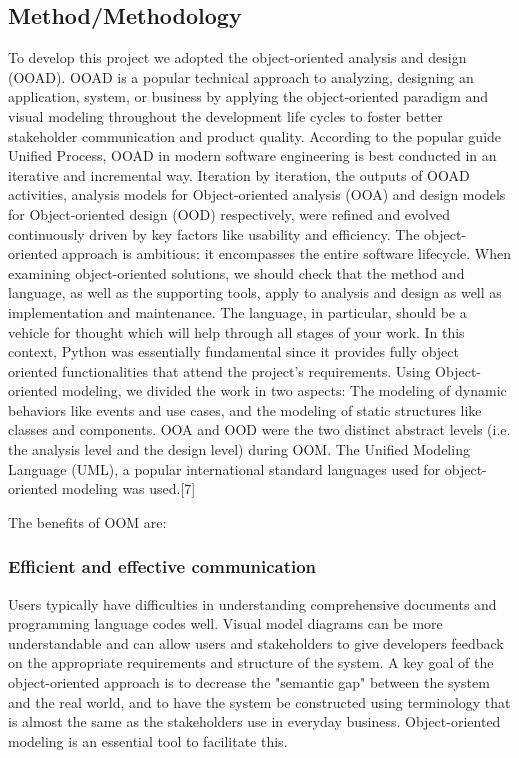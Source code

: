 \documentclass{acm_proc_article-sp}
\begin{document}
\subsection{Method/Methodology}
To develop this project we adopted the object-oriented analysis and design (OOAD). OOAD is a popular technical approach to analyzing, designing an application, system, or business by applying the object-oriented paradigm and visual modeling throughout the development life cycles to foster better stakeholder communication and product quality.
\newline
\newline
According to the popular guide Unified Process, OOAD in modern software engineering is best conducted in an iterative and incremental way. Iteration by iteration, the outputs of OOAD activities, analysis models for Object-oriented analysis (OOA) and design models for Object-oriented design (OOD) respectively, were refined and evolved continuously driven by key factors like usability and efficiency.
\newline
\newline
The object-oriented approach is ambitious: it encompasses the entire software lifecycle. When examining object-oriented solutions, we should check that the method and language, as well as the supporting tools, apply to analysis and design as well as implementation and maintenance. The language, in particular, should be a vehicle for thought which will help through all stages of your work. In this context, Python was essentially fundamental since it provides fully object oriented functionalities that attend the project's requirements. 
\newline
\newline
Using Object-oriented modeling, we divided the work in two aspects: The modeling of dynamic behaviors like events and use cases, and the modeling of static structures like classes and components. OOA and OOD were the two distinct abstract levels (i.e. the analysis level and the design level) during OOM. The Unified Modeling Language (UML), a popular international standard languages used for object-oriented modeling was used.[7]

The benefits of OOM are:

\subsubsection{Efficient and effective communication}

Users typically have difficulties in understanding comprehensive documents and programming language codes well. Visual model diagrams can be more understandable and can allow users and stakeholders to give developers feedback on the appropriate requirements and structure of the system. A key goal of the object-oriented approach is to decrease the "semantic gap" between the system and the real world, and to have the system be constructed using terminology that is almost the same as the stakeholders use in everyday business. Object-oriented modeling is an essential tool to facilitate this.
\end{document}
